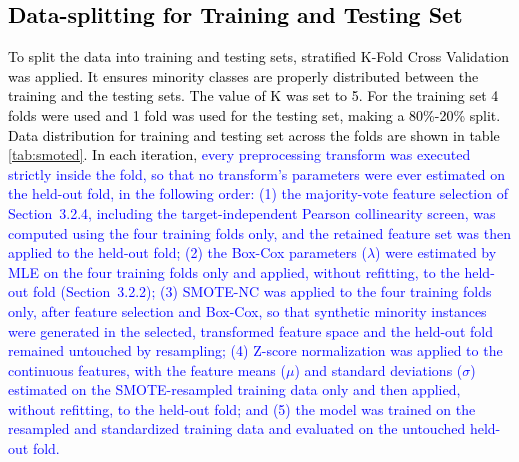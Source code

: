 \documentclass[a4paper,fleqn]{cas-sc}
\begin{document}
\textcolor{black}{\subsection{Data-splitting for Training and Testing Set}}
\textcolor{black}{To split the data into training and testing sets, stratified K-Fold Cross Validation \cite{Kohavi1995} was applied. It ensures minority classes are properly distributed between the training and the testing sets. The value of K was set to 5. For the training set 4 folds were used and 1 fold was used for the testing set, making a 80\%-20\% split. Data distribution for training and testing set across the folds are shown in table \ref{tab:smoted}. In each iteration, \textcolor{blue}{every preprocessing transform was executed strictly inside the fold, so that no transform's parameters were ever estimated on the held-out fold, in the following order: (1) the majority-vote feature selection of Section~3.2.4, including the target-independent Pearson collinearity screen, was computed using the four training folds only, and the retained feature set was then applied to the held-out fold; (2) the Box-Cox parameters ($\lambda$) were estimated by MLE on the four training folds only and applied, without refitting, to the held-out fold (Section~3.2.2); (3) SMOTE-NC was applied to the four training folds only, after feature selection and Box-Cox, so that synthetic minority instances were generated in the selected, transformed feature space and the held-out fold remained untouched by resampling; (4) Z-score normalization was applied to the continuous features, with the feature means ($\mu$) and standard deviations ($\sigma$) estimated on the SMOTE-resampled training data only and then applied, without refitting, to the held-out fold; and (5) the model was trained on the resampled and standardized training data and evaluated on the untouched held-out fold.}}
\end{document}
